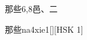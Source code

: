 \begin{entry}{那些}{6,8}{⾢、⼆}
  \begin{phonetics}{那些}{na4xie1}[][HSK 1]
  \end{phonetics}
\end{entry}

